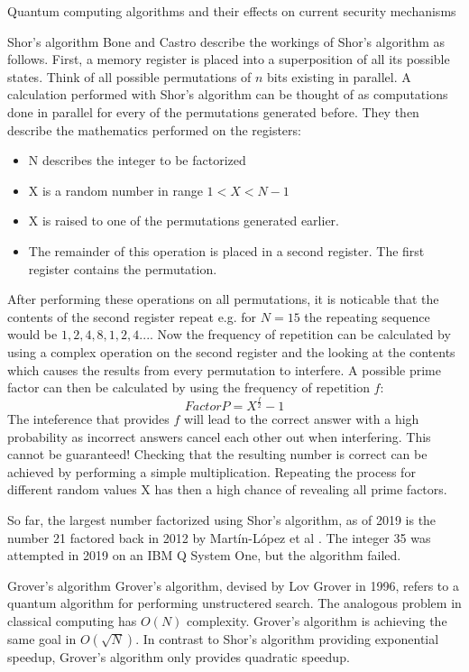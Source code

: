 \documentclass[aps,preprintnumbers,twocolumn]{revtex4}
\begin{document}
\begin{section}{Quantum computing algorithms and their effects on current security mechanisms}
\begin{subsection}{Shor's algorithm}
Bone and Castro \cite{Bone} describe the workings of Shor's algorithm as follows. First, a memory register is placed into a superposition of all its possible states. Think of all possible permutations of $n$ bits existing in parallel.
A calculation performed with Shor's algorithm can be thought of as computations done in parallel for every of the permutations generated before. 
They then describe the mathematics performed on the registers: 
\begin{itemize} 
    \item N describes the integer to be factorized
    \item X is a random number in range $1 < X < N-1$
    \item X is raised to one of the permutations generated earlier.
    \item The remainder of this operation is placed in a second register. The first register contains the permutation.
\end{itemize}
After performing these operations on all permutations, it is noticable that the contents of the second register repeat e.g. for $N = 15$ the repeating sequence would be $1,2,4,8,1,2,4...$.
Now the frequency of repetition can be calculated by using a complex operation on the second register and the looking at the contents which causes the results from every permutation to interfere. A possible prime factor can then be calculated by using the frequency of repetition $f$:
\begin{equation}
Factor P = X^{\frac{f}{2}}-1
\end{equation}
The inteference that provides $f$ will lead to the correct answer with a high probability as incorrect answers cancel each other out when interfering. This cannot be guaranteed! Checking that the resulting number is correct can be achieved by performing a simple multiplication. Repeating the process for different random values X has then a high chance of revealing all prime factors.

So far, the largest number factorized using Shor's algorithm, 
as of 2019 is the number 21 factored back in 2012 by Martín-López et al \cite{article}. 
The integer 35 was attempted in 2019 on an IBM Q System One, 
but the algorithm failed. 
\end{subsection}

\begin{subsection}{Grover's algorithm}
Grover's algorithm, devised by Lov Grover in 1996,
refers to a quantum algorithm for performing unstructered search. 
The analogous problem in classical computing has $O(N)$ complexity. 
Grover's algorithm is achieving the same goal in $O(\sqrt{N})$. 
In contrast to Shor's algorithm providing exponential speedup, 
Grover's algorithm only provides quadratic speedup. 


\end{subsection}
\end{section}
\end{document}
